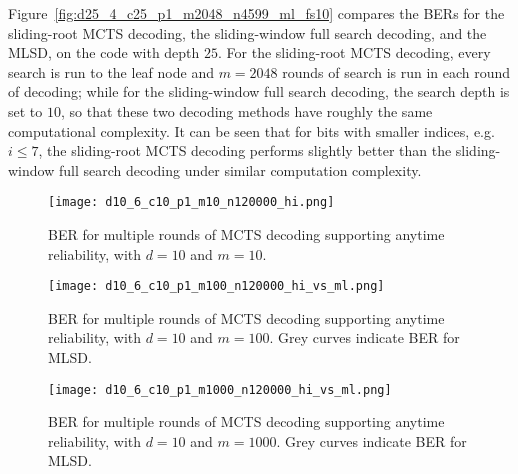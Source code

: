 \documentclass[conference,letterpaper]{IEEEtran}
\begin{document}
Figure~\ref{fig:d25_4_c25_p1_m2048_n4599_ml_fs10} compares the BERs for the sliding-root MCTS decoding, the sliding-window full search decoding, and the MLSD, on the code with depth $25$. For the sliding-root MCTS decoding, every search is run to the leaf node and $m=2048$ rounds of search is run in each round of decoding; while for the sliding-window full search decoding, the search depth is set to $10$, so that these two decoding methods have roughly the same computational complexity. It can be seen that for bits with smaller indices, e.g. $i\le 7$, the sliding-root MCTS decoding performs slightly better than the sliding-window full search decoding under similar computation complexity.



\begin{figure}[h]
	\centering
	\texttt{[image: d10\_6\_c10\_p1\_m10\_n120000\_hi.png]}
	\caption{BER for multiple rounds of MCTS decoding supporting anytime reliability, with $d=10$ and $m=10$.}
	\label{fig:d10_6_c10_p1_m10_n120000_hi}
\end{figure}

%
%

\begin{figure}[h]
	\centering
	\texttt{[image: d10\_6\_c10\_p1\_m100\_n120000\_hi\_vs\_ml.png]}
	\caption{BER for multiple rounds of MCTS decoding supporting anytime reliability, with $d=10$ and $m=100$. Grey curves indicate BER for MLSD.}
	\label{fig:d10_6_c10_p1_m100_n120000_hi_vs_ml}
\end{figure}

\begin{figure}[h]
	\centering
	\texttt{[image: d10\_6\_c10\_p1\_m1000\_n120000\_hi\_vs\_ml.png]}
	\caption{BER for multiple rounds of MCTS decoding supporting anytime reliability, with $d=10$ and $m=1000$. Grey curves indicate BER for MLSD.}
	\label{fig:d10_6_c10_p1_m1000_n120000_hi_vs_ml}
\end{figure}
\end{document}
